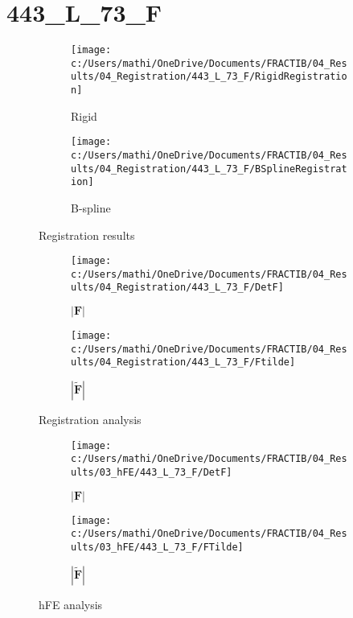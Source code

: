\documentclass{article}%
\begin{document}
%
\newpage%
\section*{443\_L\_73\_F}%
\label{sec:443L73F}%


\begin{figure}[h!]%
\begin{subfigure}[b]{0.5\linewidth}%
\texttt{[image: c:/Users/mathi/OneDrive/Documents/FRACTIB/04\_Results/04\_Registration/443\_L\_73\_F/RigidRegistration]}%
\caption{Rigid}%
\end{subfigure}%
\begin{subfigure}[b]{0.5\linewidth}%
\texttt{[image: c:/Users/mathi/OneDrive/Documents/FRACTIB/04\_Results/04\_Registration/443\_L\_73\_F/BSplineRegistration]}%
\caption{B{-}spline}%
\end{subfigure}%
\caption{Registration results}%
\end{figure}

%


\begin{figure}[h!]%
\begin{subfigure}[b]{0.5\linewidth}%
\texttt{[image: c:/Users/mathi/OneDrive/Documents/FRACTIB/04\_Results/04\_Registration/443\_L\_73\_F/DetF]}%
\caption{$|\mathbf{F}|$}%
\end{subfigure}%
\begin{subfigure}[b]{0.5\linewidth}%
\texttt{[image: c:/Users/mathi/OneDrive/Documents/FRACTIB/04\_Results/04\_Registration/443\_L\_73\_F/Ftilde]}%
\caption{$|\widetilde{\mathbf{F}}|$}%
\end{subfigure}%
\caption{Registration analysis}%
\end{figure}

%


\begin{figure}[h!]%
\begin{subfigure}[b]{0.5\linewidth}%
\texttt{[image: c:/Users/mathi/OneDrive/Documents/FRACTIB/04\_Results/03\_hFE/443\_L\_73\_F/DetF]}%
\caption{$|\mathbf{F}|$}%
\end{subfigure}%
\begin{subfigure}[b]{0.5\linewidth}%
\texttt{[image: c:/Users/mathi/OneDrive/Documents/FRACTIB/04\_Results/03\_hFE/443\_L\_73\_F/FTilde]}%
\caption{$|\widetilde{\mathbf{F}}|$}%
\end{subfigure}%
\caption{hFE analysis}%
\end{figure}
\end{document}
